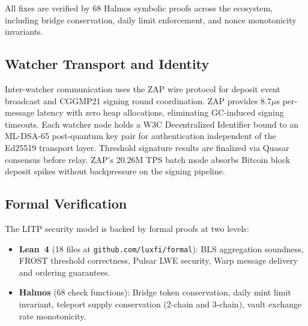 All fixes are verified by 68 Halmos symbolic proofs across the ecosystem, including bridge conservation, daily limit enforcement, and nonce monotonicity invariants.

\subsection{Watcher Transport and Identity}

Inter-watcher communication uses the ZAP wire protocol \cite{lux-zap-2023} for deposit event broadcast and CGGMP21 signing round coordination. ZAP provides 8.7$\mu$s per-message latency with zero heap allocations, eliminating GC-induced signing timeouts. Each watcher node holds a W3C Decentralized Identifier bound to an ML-DSA-65 post-quantum key pair for authentication independent of the Ed25519 transport layer. Threshold signature results are finalized via Quasar consensus before relay. ZAP's 20.26M TPS batch mode absorbs Bitcoin block deposit spikes without backpressure on the signing pipeline.

\subsection{Formal Verification}

The LITP security model is backed by formal proofs at two levels:

\begin{itemize}
    \item \textbf{Lean~4} (18 files at \texttt{github.com/luxfi/formal}): BLS aggregation soundness, FROST threshold correctness, Pulsar LWE security, Warp message delivery and ordering guarantees.
    \item \textbf{Halmos} (68 check functions): Bridge token conservation, daily mint limit invariant, teleport supply conservation (2-chain and 3-chain), vault exchange rate monotonicity.
\end{itemize}

